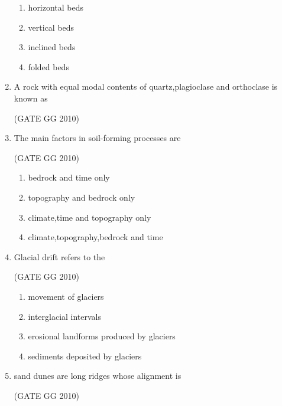 \documentclass[journal]{IEEEtran}
\begin{document}
\begin{enumerate}[start=1]
\begin{enumerate}
    \item horizontal beds
    \item vertical beds
    \item inclined beds
    \item folded beds
\end{enumerate}

\item A rock with equal modal contents of quartz,plagioclase and orthoclase is known as

\hfill{(GATE GG 2010)}

\begin{enumerate}
\end{enumerate}


\item   The main factors in soil-forming processes are

\hfill{(GATE GG 2010)}

\begin{enumerate}
\item bedrock and time only
\item topography and bedrock only
\item climate,time and topography only
\item climate,topography,bedrock and time
\end{enumerate}


\item  Glacial drift refers to the

\hfill{(GATE GG 2010)}

\begin{enumerate}
\item movement of glaciers
\item interglacial intervals
\item erosional landforms produced by glaciers
\item sediments deposited by glaciers
\end{enumerate}


\item  sand dunes are long ridges whose alignment is

\hfill{(GATE GG 2010)}


\end{enumerate}
\end{document}
